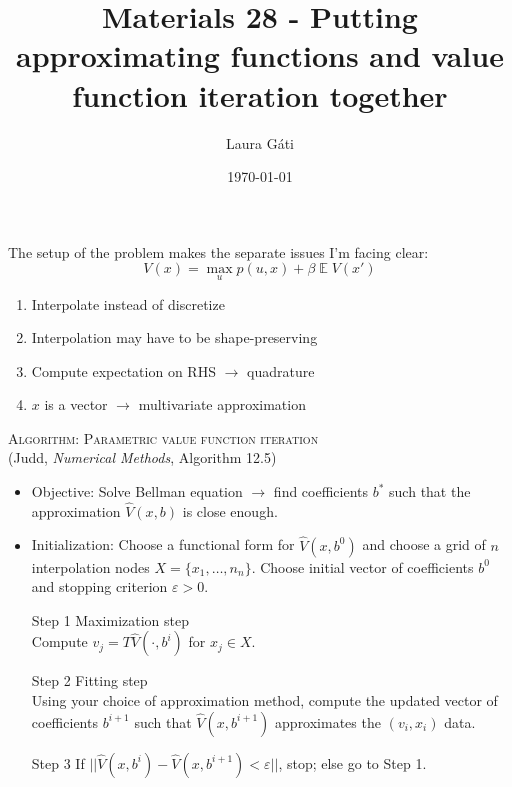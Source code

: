 \documentclass[11pt]{article}
\renewcommand{\[}{\begin{equation}}
\renewcommand{\]}{\end{equation}}
\DeclareMathOperator{\E}{\mathbb{E}}
\begin{document}
\linespread{1.0}

\title{Materials 28 - Putting approximating functions and value function iteration together}
\author{Laura G\'ati} 
\date{\today}
\maketitle




The setup of the problem makes the separate issues I'm facing clear:
\begin{equation}
V(x) = \max_u p(u,x) + \beta \E V(x')
\end{equation}
\begin{enumerate}
\item Interpolate instead of discretize 
\item Interpolation may have to be shape-preserving
\item Compute expectation on RHS $\rightarrow$ quadrature
\item $x$ is a vector $\rightarrow$ multivariate approximation
\end{enumerate}



\textsc{Algorithm: Parametric value function iteration} \\(Judd, \emph{Numerical Methods}, Algorithm 12.5)
\begin{itemize}
\item Objective: Solve Bellman equation $\rightarrow$ find coefficients $b^*$ such that the approximation $\hat{V}(x,b)$ is close enough.
\item Initialization: Choose a functional form for $\hat{V}(x,b^0)$ and choose a grid of $n$ interpolation nodes $X=\{x_1,\dots,n_n\}$. Choose initial vector of coefficients $b^0$ and stopping criterion $\varepsilon>0$.
\item[Step 1] Maximization step \\
Compute $v_j = T \hat{V}(\cdot,b^i)$ for $x_j \in X$.
\item[Step 2] Fitting step \\
Using your choice of approximation method, compute the updated vector of coefficients $b^{i+1}$ such that $\hat{V}(x,b^{i+1})$ approximates the $(v_i,x_i)$ data. 
\item[Step 3] 
If $||\hat{V}(x,b^{i}) -\hat{V}(x,b^{i+1}) < \varepsilon ||$, stop; else go to Step 1. 
\end{itemize}
\end{document}
